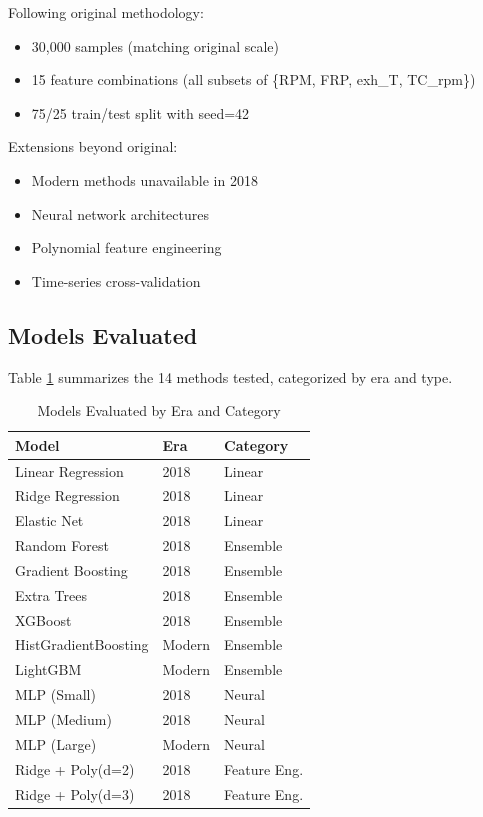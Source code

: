 \documentclass[conference]{IEEEtran}
\begin{document}
Following original methodology:
\begin{itemize}
    \item 30,000 samples (matching original scale)
    \item 15 feature combinations (all subsets of \{RPM, FRP, exh\_T, TC\_rpm\})
    \item 75/25 train/test split with seed=42
\end{itemize}

Extensions beyond original:
\begin{itemize}
    \item Modern methods unavailable in 2018
    \item Neural network architectures
    \item Polynomial feature engineering
    \item Time-series cross-validation
\end{itemize}

\subsection{Models Evaluated}

Table \ref{tab:models} summarizes the 14 methods tested, categorized by era and type.

\begin{table}[htbp]
\caption{Models Evaluated by Era and Category}
\label{tab:models}
\centering
\begin{tabular}{lll}
\toprule
\textbf{Model} & \textbf{Era} & \textbf{Category} \\
\midrule
Linear Regression & 2018 & Linear \\
Ridge Regression & 2018 & Linear \\
Elastic Net & 2018 & Linear \\
Random Forest & 2018 & Ensemble \\
Gradient Boosting & 2018 & Ensemble \\
Extra Trees & 2018 & Ensemble \\
XGBoost & 2018 & Ensemble \\
\midrule
HistGradientBoosting & Modern & Ensemble \\
LightGBM & Modern & Ensemble \\
\midrule
MLP (Small) & 2018 & Neural \\
MLP (Medium) & 2018 & Neural \\
MLP (Large) & Modern & Neural \\
\midrule
Ridge + Poly(d=2) & 2018 & Feature Eng. \\
Ridge + Poly(d=3) & 2018 & Feature Eng. \\
\bottomrule
\end{tabular}
\end{table}
\end{document}
